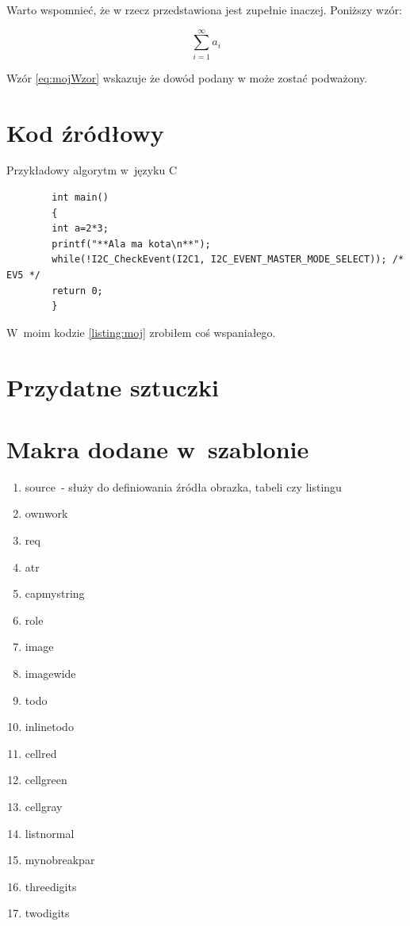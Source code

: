 \lipsum[19-20] Warto wspomnieć, że w rzecz przedstawiona jest zupełnie inaczej. Poniższy wzór:

\begin{equation}
    \sum_{i=1}^{\infty}a_i
    \label{eq:mojWzor}
\end{equation}

Wzór \ref{eq:mojWzor} wskazuje że dowód podany w może zostać podważony. \lipsum[9]

\section{Kod źródłowy}

\begin{listing}[h!]
    \caption{Przykładowy algorytm w~języku C} \label{listing:moj}
    \begin{verbatim}
        int main()
        {
        int a=2*3;
        printf("**Ala ma kota\n**");
        while(!I2C_CheckEvent(I2C1, I2C_EVENT_MASTER_MODE_SELECT)); /* EV5 */
        return 0;
        }
    \end{verbatim}
    \raggedright\source{\ownwork}
\end{listing}

W~moim kodzie \ref{listing:moj} zrobiłem coś wspaniałego. \lipsum[4]

\section{Przydatne sztuczki}
\section{Makra dodane w~szablonie}
\begin{enumerate}
    \item source~- służy do definiowania źródła obrazka, tabeli czy listingu


    \item ownwork
    \item req
    \item atr
    \item capmystring
    \item role
    \item image
    \item imagewide
    \item todo
    \item inlinetodo
    \item cellred
    \item cellgreen
    \item cellgray
    \item listnormal
    \item mynobreakpar
    \item threedigits
    \item twodigits

\end{enumerate}


